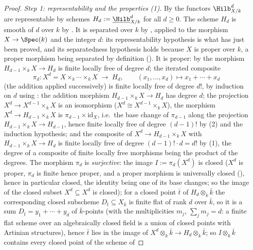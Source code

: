 \begin{proof}
\emph{Step 1: representability and the properties (1).}  By
 the functors
$\Hilb^d_{X/k}$ are representable by schemes $H_d:=\underline{\Hilb}^d_{X/k}$
for all $d\ge0$.  The scheme $H_d$ is smooth of
 $d$
over $k$ by .  It is separated over $k$ by
, applied to the morphism $X\to\Spec(k)$ and
the integer $d$: its representability hypothesis is what has just been
proved, and its separatedness hypothesis holds because $X$ is proper over
$k$, a proper morphism being separated by definition
().  It is proper: by
 the morphism
$H_{d-1}\times_kX\to H_d$ is finite locally free of degree $d$; the
iterated composite
\[
\pi_d:X^d=X\times_k\cdots\times_kX\;\longrightarrow\;H_d,
\qquad
(x_1,\dots,x_d)\longmapsto x_1+\cdots+x_d
\]
(the addition applied successively) is finite locally free of degree
$d!$, by induction on $d$ using :
the addition morphism $H_{d-1}\times_kX\to H_d$ has degree $d$; the
projection $X^d\to X^{d-1}\times_kX$ is an isomorphism
($X^d\cong X^{d-1}\times_kX$), the morphism
$X^d\to H_{d-1}\times_kX$ is $\pi_{d-1}\times\mathrm{id}_X$, i.e.\ the
base change of $\pi_{d-1}$ along the projection
$H_{d-1}\times_kX\to H_{d-1}$, hence finite locally free of degree
$(d-1)!$ by (2) and the induction
hypothesis; and the composite of $X^d\to
H_{d-1}\times_kX$ with $H_{d-1}\times_kX\to H_d$ is finite locally free
of degree $(d-1)!\cdot d=d!$ by
(1), the degree of a composite of
finite locally free morphisms being the product of the degrees.  The
morphism $\pi_d$ is
\emph{surjective}: the image $I:=\pi_d(X^d)$ is closed
($X^d$ is proper, $\pi_d$ is finite hence proper, and a proper morphism
is universally closed (), hence in
particular closed, the identity being one of its base changes; so the
image of the closed subset $X^d\subseteq X^d$ is closed); for a closed
point $\bar t$ of $H_d\otimes_k\bar k$ the corresponding closed
subscheme $D_{\bar t}\subseteq X_{\bar k}$ is finite flat of rank
$d$ over $\bar k$, so it is a sum
$D_{\bar t}=y_1+\cdots+y_d$ of $\bar k$-points (with the
multiplicities $m_j$, $\sum_jm_j=d$: a finite flat scheme over an
algebraically closed field is a union of closed points with
Artinian structures), hence $\bar t$ lies in the image of
$X^d\otimes_k\bar k\to H_d\otimes_k\bar k$; so
$I\otimes_k\bar k$ contains every closed point of the scheme of

\end{proof}
